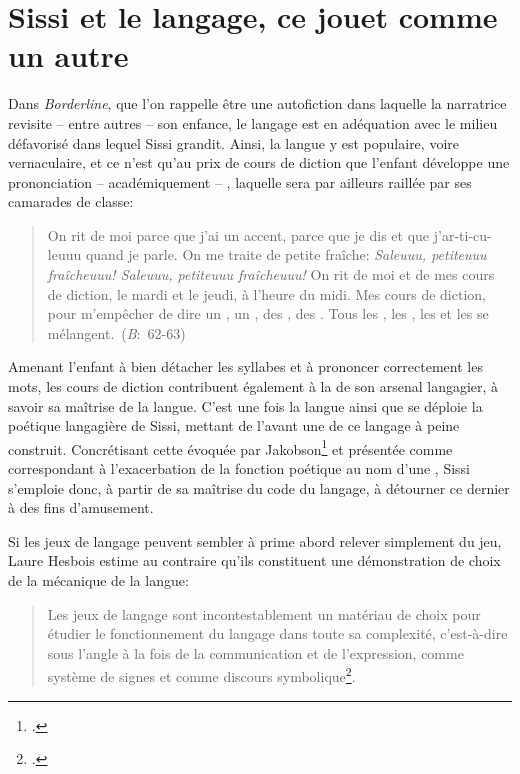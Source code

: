 \section{Sissi et le langage, ce jouet comme un autre}
Dans \textit{Borderline}, que l'on rappelle être une autofiction dans laquelle la narratrice revisite -- entre autres -- son enfance, le langage est en adéquation avec le milieu défavorisé dans lequel Sissi grandit.
Ainsi, la langue y est populaire, voire vernaculaire, et ce n'est qu'au prix de cours de diction que l'enfant développe une prononciation -- académiquement -- , laquelle sera par ailleurs raillée par ses camarades de classe:
\begin{quote}
  \begin{singlespace}
    \small
    On rit de moi parce que j'ai un accent, parce que je dis  et que j'ar-ti-cu-leuuu quand je parle. On me traite de petite fraîche: \textit{Saleuuu, petiteuuu fraîcheuuu! Saleuuu, petiteuuu fraîcheuuu!} On rit de moi et de mes cours de diction, le mardi et le jeudi, à l'heure du midi. Mes cours de diction, pour m'empêcher de dire un , un , des , des . Tous les , les , les  et les  se mélangent.~(\textit{B}:~62-63)
    \normalsize
  \end{singlespace}
\end{quote}
Amenant l'enfant à bien détacher les syllabes et à prononcer correctement les mots, les cours de diction contribuent également à la  de son arsenal langagier, à savoir sa maîtrise de la langue.
C'est une fois la langue ainsi  que se déploie la poétique langagière de Sissi, mettant de l'avant une  de ce langage à peine construit.
Concrétisant cette  évoquée par Jakobson\footcite[40]{Jakobson1973} et présentée comme correspondant à l'exacerbation de la fonction poétique au nom d'une , Sissi s'emploie donc, à partir de sa maîtrise du code du langage, à détourner ce dernier à des fins d'amusement.
\par
Si les jeux de langage peuvent sembler à prime abord relever simplement du jeu, Laure Hesbois estime au contraire qu'ils constituent une démonstration de choix de la mécanique de la langue:
\begin{quote}
  \begin{singlespace}
    \small
    Les jeux de langage sont incontestablement un matériau de choix pour étudier le fonctionnement du langage dans toute sa complexité, c'est-à-dire sous l'angle à la fois de la communication et de l'expression, comme système de signes et comme discours symbolique\footcite[18]{Hesbois1986}.
    \normalsize
  \end{singlespace}
\end{quote}
